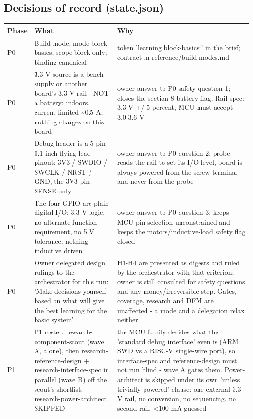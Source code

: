 \documentclass[11pt,a4paper]{article}
\begin{document}
\subsection*{Decisions of record (state.json)}
{\small
\begin{longtable}{lp{5.2cm}p{7.2cm}}
\toprule
\textbf{Phase} & \textbf{What} & \textbf{Why} \\
\midrule
\endhead
P0 & Build mode: mode block-basics; scope block-only; binding canonical & token 'learning block-basics:' in the brief; contract in reference/build-modes.md \\
P0 & 3.3 V source is a bench supply or another board's 3.3 V rail - NOT a battery; indoors, current-limited \textasciitilde{}0.5 A; nothing charges on this board & owner answer to P0 safety question 1; closes the section-8 battery flag. Rail spec: 3.3 V +/-5 percent, MCU must accept 3.0-3.6 V \\
P0 & Debug header is a 5-pin 0.1 inch flying-lead pinout: 3V3 / SWDIO / SWCLK / NRST / GND, the 3V3 pin SENSE-only & owner answer to P0 question 2; probe reads the rail to set its I/O level, board is always powered from the screw terminal and never from the probe \\
P0 & The four GPIO are plain digital I/O: 3.3 V logic, no alternate-function requirement, no 5 V tolerance, nothing inductive driven & owner answer to P0 question 3; keeps MCU pin selection unconstrained and keeps the motors/inductive-load safety flag closed \\
P0 & Owner delegated design rulings to the orchestrator for this run: 'Make decisions yourself based on what will give the best learning for the basic system' & H1-H4 are presented as digests and ruled by the orchestrator with that criterion; owner is still consulted for safety questions and any money/irreversible step. Gates, coverage, research and DFM are unaffected - a mode and a delegation relax neither \\
P1 & P1 roster: research-component-scout (wave A, alone), then research-reference-design + research-interface-spec in parallel (wave B) off the scout's shortlist. research-power-architect SKIPPED & the MCU family decides what the 'standard debug interface' even is (ARM SWD vs a RISC-V single-wire port), so interface-spec and reference-design must not run blind - wave A gates them. Power-architect is skipped under its own 'unless trivially powered' clause: one external 3.3 V rail, no conversion, no sequencing, no second rail, \textless{}100 mA guessed \\

\end{longtable}}
\end{document}

